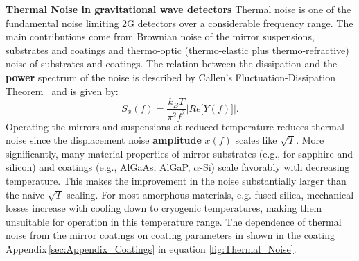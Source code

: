 \begin{Infobox}{\bf Thermal Noise in gravitational wave detectors}
\label{Box:Thermal}
Thermal noise is one of the fundamental noise limiting 2G detectors over a considerable frequency range. The main contributions come from Brownian noise of the mirror suspensions, substrates and coatings and thermo-optic (thermo-elastic plus thermo-refractive) noise of substrates and coatings. The relation between the dissipation and the {\bf power} spectrum of the noise is described by Callen's Fluctuation-Dissipation Theorem~\cite{CaWe1951, Kubo:FDT, Callen:1959} and is given by:
\begin{equation}
S_x(f) = \frac{k_B T}{\pi^2 f^2} \left| Re \big[ Y(f) \big]\right|.
\label{eq:FDT}
\end{equation}
Operating the mirrors and suspensions at reduced temperature reduces thermal noise since the displacement noise {\bf amplitude} $x(f)$ scales like $\sqrt{T}$. More significantly, many material properties of mirror substrates (e.g., for sapphire and silicon) and coatings (e.g., AlGaAs, AlGaP, $\alpha$-Si) scale favorably with decreasing temperature. This makes the improvement in the noise substantially larger than the na\"ive $\sqrt{T}$ scaling. For most amorphous materials, e.g. fused silica, mechanical losses increase with cooling down to cryogenic temperatures, making them unsuitable for operation in this temperature range. The dependence of thermal noise from the mirror coatings on coating parameters in shown in the coating Appendix\,\ref{sec:Appendix_Coatings} in equation \ref{fig:Thermal_Noise}.
\end{Infobox}
